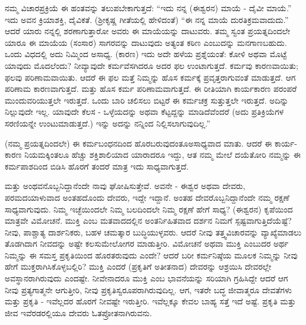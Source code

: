 ನಮ್ಮ ವಿಚಾರಪ್ರಕ್ರಿಯೆ ಈ ಹಂತವನ್ನು ತಲುಪಬೇಕಾಗುತ್ತದೆ: “ಇದು ನನ್ನ (ಈಶ್ವರನ) ಮಾಯೆ - ದೈವೀ ಮಾಯೆ.'' ಇದು ಅವನ ಕ್ರಿಯಾಶಕ್ತಿ, ದೈವಿಕತೆ. (ಶ‍್ರೀಕೃಷ್ಣ ಗೀತೆಯಲ್ಲಿ ಹೇಳಿದಂತೆ) “ಈ ನನ್ನ ಮಾಯೆ ದುರತಿಕ್ರಮವಾದುದು.” ಆದರೆ ಯಾರು ನನ್ನಲ್ಲಿ ಶರಣಾಗುತ್ತಾರೋ ಅವರು ಈ ಮಾಯೆಯನ್ನು ದಾಟುವರು. ತಮ್ಮ ಸ್ವಂತ ಪ್ರಯತ್ನದಿಂದಲೇ ಯಾರೂ ಈ ಮಾಯೆಯ (ಸಂಸಾರ) ಸಾಗರವನ್ನು ದಾಟುವುದು ಅತ್ಯಂತ ಕಠಿಣ ಎಂಬುದನ್ನು ಮನಗಾಣಬಹುದು. ಒಂದು ವಿಧದಲ್ಲಿ ಅದು ನಿಮ್ಮಿಂದ ಅಸಾಧ್ಯ. (ಕಾರಣ) ಇದು ಅದೇ ಹಳೆಯ ಪ್ರಶ್ನೆಯಂತೆ: ಕೋಳಿ ಅಥವಾ ಮೊಟ್ಟೆ ಯಾವುದು ಮೊದಲೆಂದು? ನೀವ್ಯಾವುದೇ ಕರ್ಮವೆಸಗಿದರೂ ಅದರ ಫಲ ಉಂಟಾಗುತ್ತದೆ. ಕರ್ಮವು ಕಾರಣವಾಯಿತು; ಫಲವು ಪರಿಣಾಮವಾಯಿತು. ಆದರೆ ಈ ಫಲ ಮತ್ತೆ ನಿಮ್ಮನ್ನು ಹೊಸ ಕರ್ಮಕ್ಕೆ ಪ್ರವೃತ್ತರಾಗುವಂತೆ ಮಾಡುತ್ತದೆ. ಆಗ ಪರಿಣಾಮ ಕಾರಣವಾಗುತ್ತದೆ. ಮತ್ತು ಹೊಸ ಕರ್ಮ ಪರಿಣಾಮವಾಗುತ್ತದೆ. ಈ ರೀತಿಯಾಗಿ ಕಾರ್ಯಕಾರಣ ಪರಂಪರೆ ಮುಂದುವರಿಯುತ್ತಲೇ ಇರುತ್ತದೆ. ಒಂದು ಬಾರಿ ಚಲಿಸಲು ಬಿಟ್ಟರೆ ಈ ಕರ್ಮಚಕ್ರ ಸುತ್ತುತ್ತಲೇ ಇರುತ್ತದೆ. ಅದಿನ್ನು ನಿಲ್ಲುವುದೇ ಇಲ್ಲ. ಯಾವುದೇ ಕೆಲಸ - ಒಳ್ಳೆಯದನ್ನು ಅಥವಾ ಕೆಟ್ಟದ್ದನ್ನು ಮಾಡಿದೆವೆಂದರೆ (ಅದು ಪ್ರತಿಕ್ರಿಯೆಗಳ ಸರಣಿಯನ್ನೇ ಉಂಟುಮಾಡುತ್ತದೆ.) ಇನ್ನು ಅದನ್ನು ನನ್ನಿಂದ ನಿಲ್ಲಿಸಲಾಗುವುದಿಲ್ಲ.”

(ನಮ್ಮ ಪ್ರಯತ್ನದಿಂದಲೇ) ಈ ಕರ್ಮಬಂಧನದಿಂದ ಹೊರಬರುವುದಂತೂ\break ಅಸಾಧ್ಯವಾದ ಮಾತು. ಆದರೆ ಈ ಕಾರ್ಯ-ಕಾರಣ ನಿಯಮಕ್ಕಿಂತಲೂ ಹೆಚ್ಚು ಶಕ್ತಿಶಾಲಿಯಾದ ಯಾರಾದರೂ ಇದ್ದು, ಆತ ನಮ್ಮ ಮೇಲೆ ದಯೆತೋರಿ ನಮ್ಮನ್ನು ಈ ಕರ್ಮಪಾಶದಿಂದ ಬಿಡಿಸಿ ಹೊರಗೆ ತಂದರೆ ಮಾತ್ರ ಇದು ಸಾಧ್ಯವಾಗುತ್ತದೆ.

ಮತ್ತು ಅಂಥವನೊಬ್ಬನಿದ್ದಾನೆಂದೇ ನಾವು ಘೋಷಿಸುತ್ತೇವೆ. ಅವನೇ - ಈಶ್ವರ ಅಥವಾ ದೇವರು, ಪರಮದಯಾಳುವಾದ ಅಂತಹದೊಂದು ದೇವರು, ಇದ್ದೇ ಇದ್ದಾನೆ. ಅಂತಹ ದೇವರೊಬ್ಬನಿದ್ದಾನೆಂದೇ ನಮ್ಮ ರಕ್ಷಣೆ ಸಾಧ್ಯವಾಗುವುದು. ನಿಮ್ಮ ಇಚ್ಛೆಯಿಂದಲೇ ನಿಮ್ಮ ಬಲದಿಂದಲೇ ನಿಮ್ಮ ರಕ್ಷಣೆ ಹೇಗೆ ಸಾಧ್ಯ? (ಈಶ್ವರನ) ಕೃಪೆಯಿಂದ ಮಾತ್ರವೇ ವಿಮೋಚನೆ. ಮುಕ್ತಿ ಎಂಬ ಮತವಾದದಲ್ಲಿನ ಅಂತರ್ನಿಹಿತವಾದ ದರ್ಶನ ನಿಮಗೆ ಸ್ಪಷ್ಟವಾಗುತ್ತಿದೆಯೆಷ್ಟೆ? ನೀವು, ಪಾಶ್ಚಾತ್ಯ ದಾರ್ಶನಿಕರು, ಬಹಳ ಚಮತ್ಕಾರ ಬುದ್ಧಿಯುಳ್ಳವರು. ಆದರೆ ನೀವು ತತ್ತ್ವವಿಚಾರವನ್ನು ವ್ಯಾಖ್ಯೆಮಾಡಲು ತೊಡಗಿದಾಗ ನೀವದನ್ನು ಅಷ್ಟೇ ಕಲಸುಮೇಲೋಗರ ಮಾಡುತ್ತೀರಿ. ವಿಮೋಚನೆ ಅಥವಾ ಮುಕ್ತಿ ಎಂಬುದರ ಅರ್ಥ ನಿಮ್ಮನ್ನು ಈ ಸಮಸ್ತ ಪ್ರಕೃತಿಯಿಂದ ಹೊರತರುವುದು ಎಂದೇ? ಆದರೆ ಬರೀ ಕರ್ಮನಿಷ್ಠೆಯ ಮೂಲಕ ನಿಮ್ಮನ್ನು ನೀವು ಹೇಗೆ ಮುಕ್ತರಾಗಿಸಿಕೊಳ್ಳಬಲ್ಲಿರಿ? ಮುಕ್ತಿ ಎಂದರೆ (ಪ್ರಕೃತಿಗೆ ಅತೀತನಾದ) ದೇವರನ್ನು ಆಶ್ರಯಿಸಿ ದೇವರಲ್ಲೇ ಅವಸ್ಥಾನರಾಗಿರುವುದು ಎಂದಷ್ಟೇ. ನೀವೇನಾದರೂ ಮುಕ್ತಿ ಎಂಬ ಭಾವನೆಯನ್ನು ಸರಿಯಾಗಿ ಗ್ರಹಿಸಿದ್ದೇ ಆದರೆ ಆಗ ನೀವು ಪ್ರತ್ಯಗಾತ್ಮನೇ ಆಗುತ್ತೀರಿ, ನೀವು ಪ್ರಕೃತಿಸ್ವರೂಪರಾಗಿರುವುದಿಲ್ಲ. ಆಗ, ಇತರೇ ಬದ್ಧ ಜೀವಾತ್ಮರೂ ದೇವತೆಗಳು ಮತ್ತು ಪ್ರಕೃತಿ - ಇವೆಲ್ಲದರ ಹೊರಗೆ ನೀವಷ್ಟೇ ಇರುತ್ತೀರಿ. ಇವೆಲ್ಲಕ್ಕೂ ಕೇವಲ ಬಾಹ್ಯ ಸತ್ತೆ ಇದೆ ಅಷ್ಟೆ. ಪ್ರಕೃತಿ ಮತ್ತು ಜೀವ ಇವೆರಡರಲ್ಲಿಯೂ ದೇವರು ಓತಪ್ರೋತನಾಗಿರುವನು.

